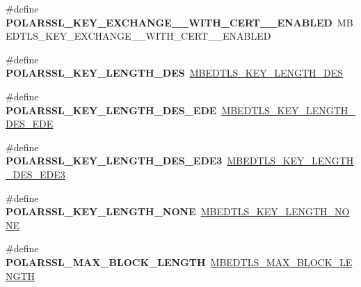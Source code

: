 \begin{DoxyCompactItemize}
\item 
\mbox{\label{compat-1_83_8h_ab01d7456e7fb60ef9d335589b643afc0}} 
\#define {\bfseries P\+O\+L\+A\+R\+S\+S\+L\+\_\+\+K\+E\+Y\+\_\+\+E\+X\+C\+H\+A\+N\+G\+E\+\_\+\+\_\+\+W\+I\+T\+H\+\_\+\+C\+E\+R\+T\+\_\+\+\_\+\+E\+N\+A\+B\+L\+ED}~M\+B\+E\+D\+T\+L\+S\+\_\+\+K\+E\+Y\+\_\+\+E\+X\+C\+H\+A\+N\+G\+E\+\_\+\+\_\+\+W\+I\+T\+H\+\_\+\+C\+E\+R\+T\+\_\+\+\_\+\+E\+N\+A\+B\+L\+ED
\item 
\mbox{\label{compat-1_83_8h_af0a819a451398d93d26ed8c74826e035}} 
\#define {\bfseries P\+O\+L\+A\+R\+S\+S\+L\+\_\+\+K\+E\+Y\+\_\+\+L\+E\+N\+G\+T\+H\+\_\+\+D\+ES}~\mbox{\hyperlink{cipher_8h_a61dadd085c1777f559549e05962b2c9ea0786b4375829efe98db9d73c5b12eda1}{M\+B\+E\+D\+T\+L\+S\+\_\+\+K\+E\+Y\+\_\+\+L\+E\+N\+G\+T\+H\+\_\+\+D\+ES}}
\item 
\mbox{\label{compat-1_83_8h_ac22180150a97ef4556ec884819d886aa}} 
\#define {\bfseries P\+O\+L\+A\+R\+S\+S\+L\+\_\+\+K\+E\+Y\+\_\+\+L\+E\+N\+G\+T\+H\+\_\+\+D\+E\+S\+\_\+\+E\+DE}~\mbox{\hyperlink{cipher_8h_a61dadd085c1777f559549e05962b2c9eade90f9d4c430f18b705faac59b2ed0b9}{M\+B\+E\+D\+T\+L\+S\+\_\+\+K\+E\+Y\+\_\+\+L\+E\+N\+G\+T\+H\+\_\+\+D\+E\+S\+\_\+\+E\+DE}}
\item 
\mbox{\label{compat-1_83_8h_a2f488b32778f88809abbad3baf8456b3}} 
\#define {\bfseries P\+O\+L\+A\+R\+S\+S\+L\+\_\+\+K\+E\+Y\+\_\+\+L\+E\+N\+G\+T\+H\+\_\+\+D\+E\+S\+\_\+\+E\+D\+E3}~\mbox{\hyperlink{cipher_8h_a61dadd085c1777f559549e05962b2c9eae5eb36c0a8ae45bec5b0070292be6c17}{M\+B\+E\+D\+T\+L\+S\+\_\+\+K\+E\+Y\+\_\+\+L\+E\+N\+G\+T\+H\+\_\+\+D\+E\+S\+\_\+\+E\+D\+E3}}
\item 
\mbox{\label{compat-1_83_8h_a9fbd4355a3b5ffe73e501ff4ec4413f3}} 
\#define {\bfseries P\+O\+L\+A\+R\+S\+S\+L\+\_\+\+K\+E\+Y\+\_\+\+L\+E\+N\+G\+T\+H\+\_\+\+N\+O\+NE}~\mbox{\hyperlink{cipher_8h_a61dadd085c1777f559549e05962b2c9ea27a227b285707a038e87cee36a8d1a65}{M\+B\+E\+D\+T\+L\+S\+\_\+\+K\+E\+Y\+\_\+\+L\+E\+N\+G\+T\+H\+\_\+\+N\+O\+NE}}
\item 
\mbox{\label{compat-1_83_8h_aa2488bd674e8deee5938b1926f4868f0}} 
\#define {\bfseries P\+O\+L\+A\+R\+S\+S\+L\+\_\+\+M\+A\+X\+\_\+\+B\+L\+O\+C\+K\+\_\+\+L\+E\+N\+G\+TH}~\mbox{\hyperlink{cipher_8h_ab8f30dc90403204515f868c3b6196ffd}{M\+B\+E\+D\+T\+L\+S\+\_\+\+M\+A\+X\+\_\+\+B\+L\+O\+C\+K\+\_\+\+L\+E\+N\+G\+TH}}

\end{DoxyCompactItemize}

